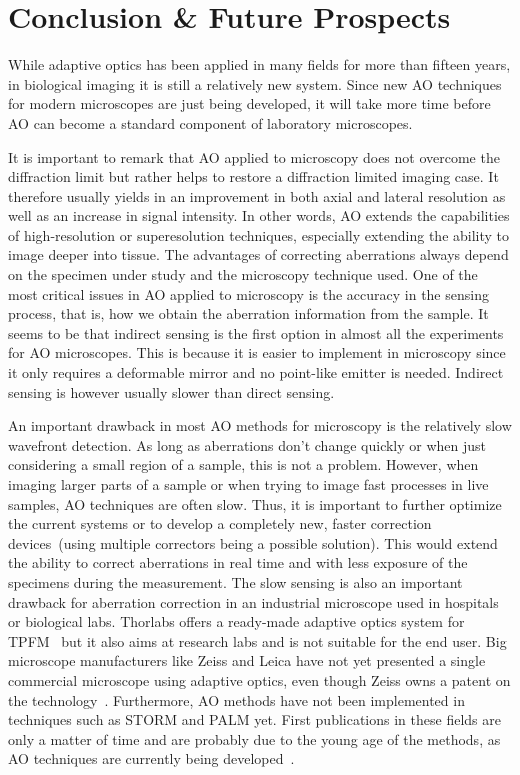 \section{Conclusion \& Future Prospects}
\label{sec:Future}

While adaptive optics has been applied in many fields for more than fifteen years, in biological imaging it is still a relatively new system. Since new AO techniques for modern microscopes are just being developed, it will take more time before AO can become a standard component of laboratory microscopes.  

It is important to remark that AO applied to microscopy does not overcome the diffraction limit but rather helps to restore a diffraction limited imaging case. It therefore usually yields in an improvement in both axial and lateral resolution as well as an increase in signal intensity. In other words, AO extends the capabilities of high-resolution or superesolution techniques, especially extending the ability to image deeper into tissue. The advantages of correcting aberrations always depend on the specimen under study and the microscopy technique used. One of the most critical issues in AO applied to microscopy is the accuracy in the sensing process, that is, how we obtain the aberration information from the sample. It seems to be that indirect sensing is the first option in almost all the experiments for AO microscopes. This is because it is easier to implement in microscopy since it only requires a deformable mirror and no point-like emitter is needed. Indirect sensing is however usually slower than direct sensing. 

An important drawback in most AO methods for microscopy is the relatively slow wavefront detection. As long as aberrations don't change quickly or when just considering a small region of a sample, this is not a problem. However, when imaging larger parts of a sample or when trying to image fast processes in live samples, AO techniques are often slow. Thus, it is important to further optimize the current systems or to develop a completely new, faster correction devices~(using multiple correctors being a possible solution). This would extend the ability to correct aberrations in real time and with less exposure of the specimens during the measurement. The slow sensing is also an important drawback for aberration correction in an industrial microscope used in hospitals or biological labs. Thorlabs offers a ready-made adaptive optics system for TPFM~\cite{future_thorlabs} but it also aims at research labs and is not suitable for the end user. Big microscope manufacturers like Zeiss and Leica have not yet presented a single commercial microscope using adaptive optics, even though Zeiss owns a patent on the technology~\cite{future_zeiss_patent}. Furthermore, AO methods have not been implemented in techniques such as STORM and PALM yet. First publications in these fields are only a matter of time and are probably due to the young age of the methods, as AO techniques are currently being developed~\cite{future_AOM_PALM_1}. \newline


